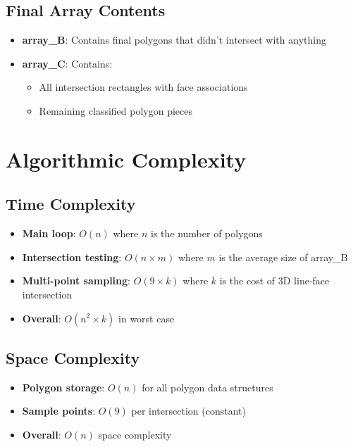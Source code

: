 \documentclass[12pt,a4paper]{article}
\begin{document}
\subsection{Final Array Contents}

\begin{itemize}
    \item \textbf{array\_B}: Contains final polygons that didn't intersect with anything
    \item \textbf{array\_C}: Contains:
    \begin{itemize}
        \item All intersection rectangles with face associations
        \item Remaining classified polygon pieces
    \end{itemize}
\end{itemize}

\section{Algorithmic Complexity}

\subsection{Time Complexity}
\begin{itemize}
    \item \textbf{Main loop}: $O(n)$ where $n$ is the number of polygons
    \item \textbf{Intersection testing}: $O(n \times m)$ where $m$ is the average size of array\_B
    \item \textbf{Multi-point sampling}: $O(9 \times k)$ where $k$ is the cost of 3D line-face intersection
    \item \textbf{Overall}: $O(n^2 \times k)$ in worst case
\end{itemize}

\subsection{Space Complexity}
\begin{itemize}
    \item \textbf{Polygon storage}: $O(n)$ for all polygon data structures
    \item \textbf{Sample points}: $O(9)$ per intersection (constant)
    \item \textbf{Overall}: $O(n)$ space complexity
\end{itemize}
\end{document}
